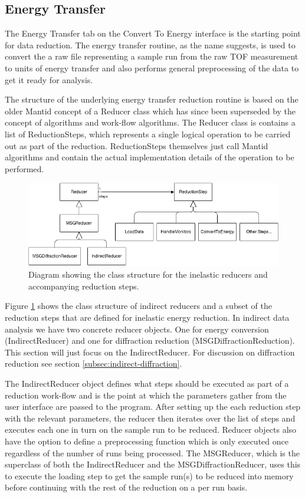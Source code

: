 \documentclass[paper=a4, fontsize=11pt]{scrartcl}	%
\numberwithin{equation}{section}															%
\numberwithin{figure}{section}																%
\numberwithin{table}{section}																%
\begin{document}
\subsection{Energy Transfer}
\label{sec:energy-transfer}
The Energy Transfer tab on the Convert To Energy interface is the starting point for data reduction. The energy transfer routine, as the name suggests, is used to convert the a raw file representing a sample run from the raw TOF measurement to units of energy transfer and also performs general preprocessing of the data to get it ready for analysis.

The structure of the underlying energy transfer reduction routine is based on the older Mantid concept of a Reducer class which has since been superseded by the concept of algorithms and work-flow algorithms. The Reducer class is contains a list of ReductionSteps, which represents a single logical operation to be carried out as part of the reduction. ReductionSteps themselves just call Mantid algorithms and contain the actual implementation details of the operation to be performed.

\begin{figure}[H]
\centering
\includegraphics[width=1\textwidth]{img/uml/class_diagrams/Reducer_structure.png}
\caption{Diagram showing the class structure for the inelastic reducers and accompanying reduction steps.}
\label{fig:reducer-structure-diagram}
\end{figure}

Figure \ref{fig:reducer-structure-diagram} shows the class structure of indirect reducers and a subset of the reduction steps that are defined for inelastic energy reduction. In indirect data analysis we have two concrete reducer objects. One for energy conversion (IndirectReducer) and one for diffraction reduction (MSGDiffractionReduction). This section will just focus on the IndirectReducer. For discussion on diffraction reduction see section \ref{subsec:indirect-diffraction}.

The IndirectReducer object defines what steps should be executed as part of a reduction work-flow and is the point at which the parameters gather from the user interface are passed to the program. After setting up the each reduction step with the relevant parameters, the reducer then iterates over the list of steps and executes each one in turn on the sample run to be reduced. Reducer objects also have the option to define a preprocessing function which is only executed once regardless of the number of runs being processed. The MSGReducer, which is the superclass of both the IndirectReducer and the MSGDiffractionReducer, uses this to execute the loading step to get the sample run(s) to be reduced into memory before continuing with the rest of the reduction on a per run basis.
\end{document}
